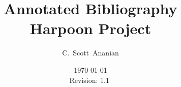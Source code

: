 \documentclass[10pt,notitlepage]{article}
\author{C.~Scott~Ananian}
\title{Annotated Bibliography \\ \Large Harpoon Project}
\date{\today \\ $ $Revision: 1.1 $ $}
\begin{document}

\maketitle
\nocite{*}

\end{document}
